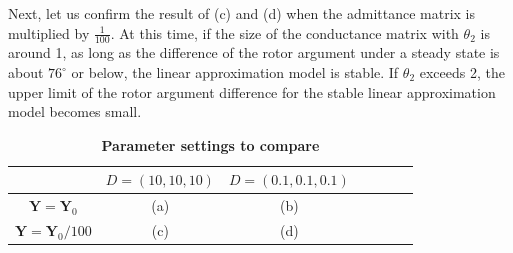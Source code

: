 \documentclass[graybox, envcountchap]{svmult}
\begin{document}
\begin{example}
Next, let us confirm the result of (c) and (d) when the admittance matrix is multiplied by $\tfrac{1}{100}$.
At this time, if the size of the conductance matrix with $\theta_2$ is around 1, as long as the difference of the rotor argument under a steady state is about $76^\circ$ or below, the linear approximation model is stable.
If $\theta_2$ exceeds 2, the upper limit of the rotor argument difference for the stable linear approximation model becomes small.

\end{example}

\begin{table}[h]
\medskip
 \caption{\textbf{Parameter settings to compare}}
 \label{table:parasetcom}
 \centering
  \begin{tabular}{|c|c|c|c|c|c|c|}
   \hline
 &    $D=(10,10,10)$ &   $D=(0.1,0.1,0.1)$ \\
   \hline 
 $\bm{Y} =\bm{Y}_0$ & (a) & (b) \\
   \hline
 $\bm{Y} = \bm{Y}_0/100  $  & (c) & (d) \\
   \hline
  \end{tabular}
\end{table}
\end{document}
